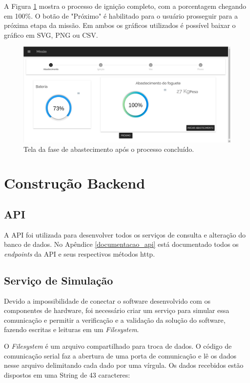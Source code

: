 A Figura \ref{fig:fim_ignicao} mostra o processo de ignição completo, com a porcentagem chegando em 100\%. O botão de "Próximo" é habilitado para o usuário prosseguir para a próxima etapa da missão. Em ambos os gráficos utilizados é possível baixar o gráfico em SVG, PNG ou CSV.

\begin{figure}[h!]
	\centering
		\includegraphics[keepaspectratio=true,scale=0.33]{figuras/telas_software/7-full.png}
	\caption{Tela da fase de abastecimento após o processo concluído.}
	\label{fig:fim_ignicao}
\end{figure}

\section{Construção Backend}

\subsection{API}

A API foi utilizada para desenvolver todos os serviços de consulta e alteração do banco de dados. No Apêndice \ref{documentacao_api} está documentado todos os \textit{endpoints} da API e seus respectivos métodos http. 

\subsection{Serviço de Simulação}

\par Devido a impossibilidade de conectar o software desenvolvido com os componentes de hardware, foi necessário criar um serviço para simular essa comunicação e permitir a verificação e a validação da solução do software, fazendo escritas e leituras em um \textit{Filesystem}. 
\par O \textit{Filesystem} é um arquivo compartilhado para troca de dados. O código de comunicação serial faz a abertura de uma porta de comunicação e lê os dados nesse arquivo  delimitando cada dado por uma vírgula. Os dados recebidos estão dispostos em uma String de 43 caracteres: 

